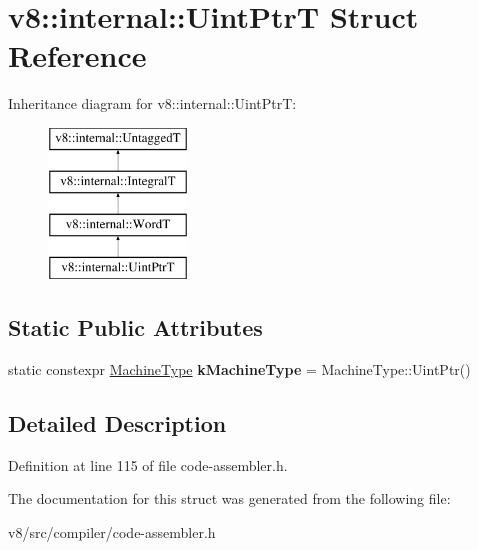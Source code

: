 \hypertarget{structv8_1_1internal_1_1UintPtrT}{}\section{v8\+:\+:internal\+:\+:Uint\+PtrT Struct Reference}
\label{structv8_1_1internal_1_1UintPtrT}
Inheritance diagram for v8\+:\+:internal\+:\+:Uint\+PtrT\+:\begin{figure}[H]
\begin{center}
\leavevmode
\includegraphics[height=4.000000cm]{structv8_1_1internal_1_1UintPtrT}
\end{center}
\end{figure}
\subsection*{Static Public Attributes}
\begin{DoxyCompactItemize}
\item 
\mbox{\label{structv8_1_1internal_1_1UintPtrT_a3dc22b31332d5a551adcd4ccfd81c3fd}} 
static constexpr \mbox{\hyperlink{classv8_1_1internal_1_1MachineType}{Machine\+Type}} {\bfseries k\+Machine\+Type} = Machine\+Type\+::\+Uint\+Ptr()
\end{DoxyCompactItemize}


\subsection{Detailed Description}


Definition at line 115 of file code-\/assembler.\+h.



The documentation for this struct was generated from the following file\+:\begin{DoxyCompactItemize}
\item 
v8/src/compiler/code-\/assembler.\+h\end{DoxyCompactItemize}
